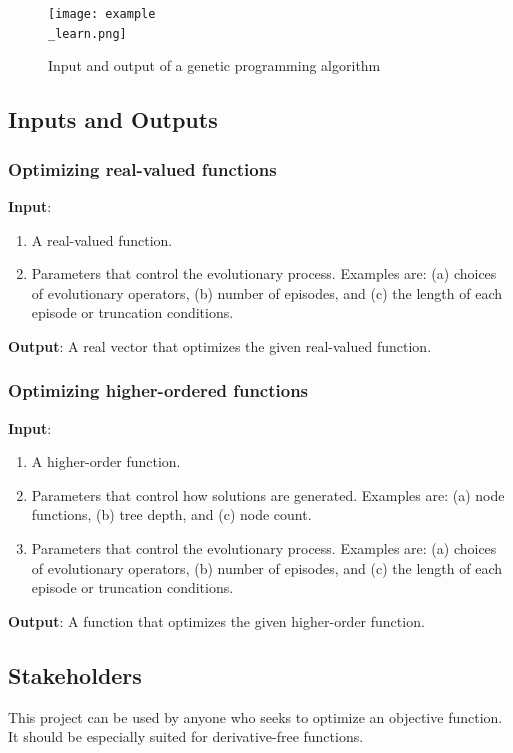 \documentclass{article}
\begin{document}
\begin{figure}[h]
    \caption{Input and output of a genetic programming algorithm}
    \texttt{[image: example\\\_learn.png]}
    \centering
\end{figure}

\subsection{Inputs and Outputs}


\subsubsection{Optimizing real-valued functions}
\textbf{Input}:
\begin{enumerate}
    \item A real-valued function.
    \item Parameters that control the evolutionary process. Examples are: (a) choices of evolutionary operators, (b) number of episodes, and (c) the length of each episode or truncation conditions.
\end{enumerate}
\textbf{Output}: A real vector that optimizes the given real-valued function.

\subsubsection{Optimizing higher-ordered functions}
\textbf{Input}:
\begin{enumerate}
    \item A higher-order function.
    \item Parameters that control how solutions are generated. Examples are: (a) node functions, (b) tree depth, and (c) node count.
    \item Parameters that control the evolutionary process. Examples are: (a) choices of evolutionary operators, (b) number of episodes, and (c) the length of each episode or truncation conditions.
\end{enumerate}
\textbf{Output}: A function that optimizes the given higher-order function.

\subsection{Stakeholders}
This project can be used by anyone who seeks to optimize an objective function. It should be especially suited for derivative-free functions.
\end{document}
